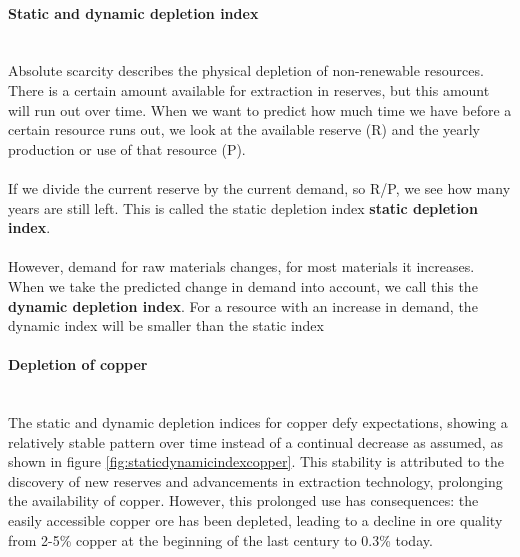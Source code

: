 \documentclass[../summary.tex]{subfiles}
\begin{document}
\paragraph{Static and dynamic depletion index}
\ \\
Absolute scarcity describes the physical depletion of non-renewable resources. There is a certain amount available for extraction in reserves, but this amount will run out over time. When we want to predict how much time we have before a certain resource runs out, we look at the available reserve (R) and the yearly production or use of that resource (P).\\
\\
If we divide the current reserve by the current demand, so R/P, we see how many years are still left. This is called the static depletion index \textbf{static depletion index}. \\
\\
However, demand for raw materials changes, for most materials it increases. When we take the predicted change in demand into account, we call this the \textbf{dynamic depletion index}. For a resource with an increase in demand, the dynamic index will be smaller than the static index

\paragraph{Depletion of copper}
\ \\
The static and dynamic depletion indices for copper defy expectations, showing a relatively stable pattern over time instead of a continual decrease as assumed, as shown in figure \ref{fig:staticdynamicindexcopper}. This stability is attributed to the discovery of new reserves and advancements in extraction technology, prolonging the availability of copper. However, this prolonged use has consequences: the easily accessible copper ore has been depleted, leading to a decline in ore quality from 2-5\% copper at the beginning of the last century to 0.3\% today.
\newpage
\end{document}
